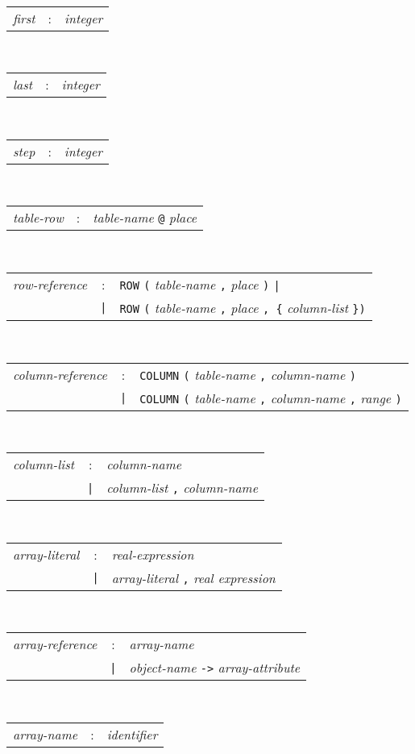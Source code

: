\\
\begin{tabular}{p{4cm}cl}
\textit{first}
  &:& \textit{integer}
\end{tabular}
\\
\begin{tabular}{p{4cm}cl}
\textit{last}
  &:& \textit{integer}
\end{tabular}
\\
\begin{tabular}{p{4cm}cl}
\textit{step}
  &:& \textit{integer}
\end{tabular}
\\
\begin{tabular}{p{4cm}cl}
\textit{table-row}
  &:& \textit{table-name} \texttt{@} \textit{place}
\end{tabular}
\\
\begin{tabular}{p{4cm}cl}
\textit{row-reference}
  &:& \texttt{ROW} \texttt{(} \textit{table-name} \texttt{,}
    \textit{place} \texttt{)} \texttt{|} \\
  &\texttt{|}& \texttt{ROW} \texttt{(} \textit{table-name} \texttt{,}
    \textit{place} \texttt{, \{} \textit{column-list} \texttt{\})}
\end{tabular}
\\
\begin{tabular}{p{4cm}cl}
\textit{column-reference}
  &:& \texttt{COLUMN} \texttt{(} \textit{table-name} \texttt{,}
    \textit{column-name} \texttt{)} \\
  &\texttt{|}& \texttt{COLUMN} \texttt{(} \textit{table-name} \texttt{,}
    \textit{column-name} \texttt{,} \textit{range} \texttt{)}
\end{tabular}
\\
\begin{tabular}{p{4cm}cl}
\textit{column-list}
  &:& \textit{column-name} \\
  &\texttt{|}& \textit{column-list} \texttt{,} \textit{column-name}
\end{tabular}
\\
\begin{tabular}{p{4cm}cl}
\textit{array-literal}
  &:& \textit{real-expression} \\
  &\texttt{|}& \textit{array-literal} \texttt{,} \textit{real expression}
\end{tabular}
\\
\begin{tabular}{p{4cm}cl}
\textit{array-reference}
  &:& \textit{array-name} \\
  &\texttt{|}& \textit{object-name} \texttt{->} \textit{array-attribute}
\end{tabular}
\\
\begin{tabular}{p{4cm}cl}
\textit{array-name}
  &:& \textit{identifier}
\end{tabular}

